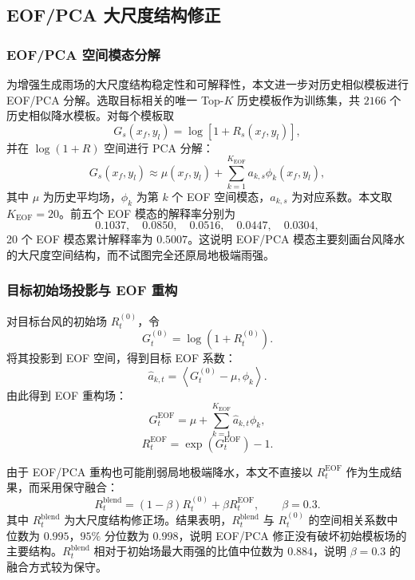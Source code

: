 \documentclass[UTF8,a4paper,zihao=5,fontset=fandol]{ctexart}
\numberwithin{equation}{section}
\numberwithin{figure}{section}
\numberwithin{table}{section}
\begin{document}
\subsection{EOF/PCA 大尺度结构修正}

\subsubsection{EOF/PCA 空间模态分解}

为增强生成雨场的大尺度结构稳定性和可解释性，本文进一步对历史相似模板进行 EOF/PCA 分解。选取目标相关的唯一 Top-$K$ 历史模板作为训练集，共 $2166$ 个历史相似降水模板。对每个模板取
\begin{equation}
G_s(x_f,y_l)=\log\left[1+R_s(x_f,y_l)\right],
\end{equation}
并在 $\log(1+R)$ 空间进行 PCA 分解：
\begin{equation}
G_s(x_f,y_l)
\approx
\mu(x_f,y_l)+
\sum_{k=1}^{K_{\mathrm{EOF}}}a_{k,s}\phi_k(x_f,y_l),
\end{equation}
其中 $\mu$ 为历史平均场，$\phi_k$ 为第 $k$ 个 EOF 空间模态，$a_{k,s}$ 为对应系数。本文取 $K_{\mathrm{EOF}}=20$。前五个 EOF 模态的解释率分别为
\[
0.1037,\quad 0.0850,\quad 0.0516,\quad 0.0447,\quad 0.0304,
\]
20 个 EOF 模态累计解释率为 $0.5007$。这说明 EOF/PCA 模态主要刻画台风降水的大尺度空间结构，而不试图完全还原局地极端雨强。

\subsubsection{目标初始场投影与 EOF 重构}

对目标台风的初始场 $R_t^{(0)}$，令
\begin{equation}
G_t^{(0)}=\log\left(1+R_t^{(0)}\right).
\end{equation}
将其投影到 EOF 空间，得到目标 EOF 系数：
\begin{equation}
\hat a_{k,t}
=
\left\langle
G_t^{(0)}-\mu,\phi_k
\right\rangle.
\end{equation}
由此得到 EOF 重构场：
\begin{equation}
G_t^{\mathrm{EOF}}
=
\mu+\sum_{k=1}^{K_{\mathrm{EOF}}}\hat a_{k,t}\phi_k,
\end{equation}
\begin{equation}
R_t^{\mathrm{EOF}}
=
\exp\left(G_t^{\mathrm{EOF}}\right)-1.
\end{equation}

由于 EOF/PCA 重构也可能削弱局地极端降水，本文不直接以 $R_t^{\mathrm{EOF}}$ 作为生成结果，而采用保守融合：
\begin{equation}
R_t^{\mathrm{blend}}
=
(1-\beta)R_t^{(0)}+\beta R_t^{\mathrm{EOF}},
\qquad \beta=0.3.
\end{equation}
其中 $R_t^{\mathrm{blend}}$ 为大尺度结构修正场。结果表明，$R_t^{\mathrm{blend}}$ 与 $R_t^{(0)}$ 的空间相关系数中位数为 $0.995$，$95\%$ 分位数为 $0.998$，说明 EOF/PCA 修正没有破坏初始模板场的主要结构。$R_t^{\mathrm{blend}}$ 相对于初始场最大雨强的比值中位数为 $0.884$，说明 $\beta=0.3$ 的融合方式较为保守。
\end{document}
